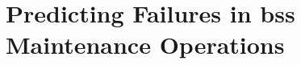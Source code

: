 \chapter[Predicting Failures in BSS Maintenance Operations]{Predicting Failures in \ac{bss} Maintenance Operations}
\label{ch:results_failure_forecasting}




